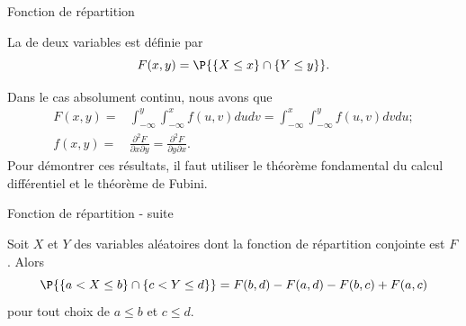 \documentclass[nuit,charter,pied]{BeamerJS}
\begin{document}
\begin{frame}[t]{Fonction de répartition}
	\pause
	\begin{defn}{}
		La  de deux variables est définie par
		\[F(x,y)=\P{\{X\leq x\}\cap\{Y\leq y\}}.\]
	\end{defn}
	Dans le cas absolument continu, nous avons que
	\begin{align*}
		F(x,y)=&\int_{-\infty}^{y}\int_{-\infty}^{x} f(u,v)dudv=\int_{-\infty}^{x}\int_{-\infty}^{y} f(u,v)dvdu;\\
		f(x,y)=&\frac{\partial^2F}{\partial x\partial y}=\frac{\partial^2F}{\partial y\partial x}.
	\end{align*}
	Pour démontrer ces résultats, il faut utiliser le théorème fondamental du calcul différentiel et le théorème de Fubini.
\end{frame}
\begin{frame}[t]{Fonction de répartition - suite}
	\pause
	\begin{prop}
		Soit $X$ et $Y$ des variables aléatoires dont la fonction de répartition conjointe est $F$. Alors
		\[\P{\{a<X\leq b\}\cap\{c<Y\leq d\}}=F(b,d)-F(a,d)-F(b,c)+F(a,c)\]
		pour tout choix de $a\leq b$ et $c\leq d$.
	\end{prop}
\end{frame}
\end{document}
